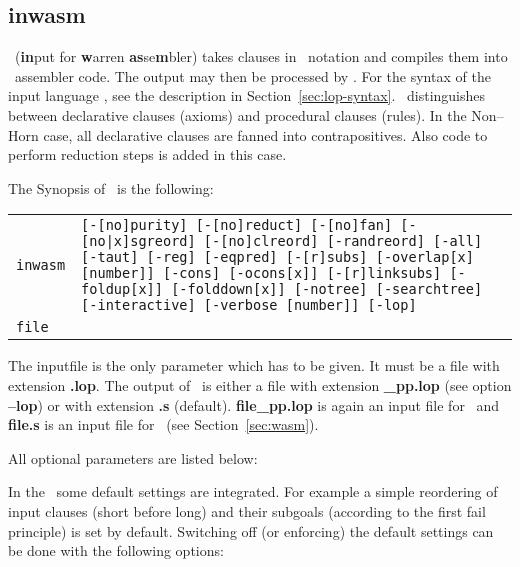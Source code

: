 %
\subsection{inwasm}\label{sec:inwasm}

\Inw\ ({\bf in}put for {\bf w}arren {\bf as}se{\bf m}bler) takes
clauses in \LOP\ 
notation and compiles them into \SAM\ assembler code.  The
output  may  then  be  processed  by \wasm. For  the syntax of
the input language \LOP, see the 
description in Section~\ref{sec:lop-syntax}. \Inw\ distinguishes
between  declarative clauses (axioms) and procedural clauses
(rules). In the Non--Horn case, all declarative clauses are
fanned into contrapositives. Also code to perform reduction
steps is added in this case. 

The Synopsis of \inw\ is the following:

\begin{tabular}{lp{14cm}}
      {\tt inwasm}  &  {\tt [-[no]purity] [-[no]reduct] [-[no]fan] 
                            [-[no|x]sgreord] [-[no]clreord] [-randreord]
                            [-all]
                            [-taut] [-reg] [-eqpred]
                            [-[r]subs] [-overlap[x] [number]] 
                            [-cons] [-ocons[x]] 
                            [-[r]linksubs]
                            [-foldup[x]] [-folddown[x]] 
                            [-notree] [-searchtree] [-interactive]
                            [-verbose [number]]
                            [-lop]}  \\
      {\tt file}    &  
\end{tabular}

The inputfile is the only parameter which has to be given. It must be
a file with extension {\bf .lop}. The output of \inw\ is either a file
with extension {\bf \_pp.lop} (see option {\bf --lop}) or with
extension {\bf .s} (default). {\bf file\_pp.lop} is again an input
file for \inw\ and {\bf file.s} is an input file for \wasm\ (see
Section~\ref{sec:wasm}). 

All optional parameters are listed below:

In the \inw\ some default settings are integrated. For example a
simple reordering  of  input  clauses (short before long) and
their subgoals (according to the first fail principle) is  set
by default.  Switching off (or enforcing) the default settings
can be done with the following options:  

